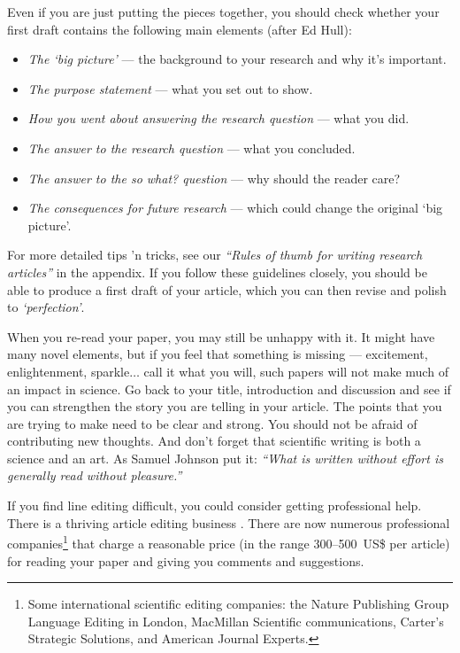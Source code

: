 \documentclass[graybox,envcountchap,sectrefs,UStrade]{svmono}
\begin{document}
Even if you are just putting the pieces together, you should check whether your first draft contains the following main elements (after Ed Hull):

\begin{itemize}
    \item \emph{The `big picture'} --- the background to your research and why it's important.
    \item \emph{The purpose statement} --- what you set out to show.
    \item \emph{How you went about answering the research question} --- what you did.
    \item \emph{The answer to the research question} --- what you concluded.
    \item \emph{The answer to the \emph{so what?} question} --- why should the reader care?
    \item \emph{The consequences for future research} --- which could change the original `big picture'.
\end{itemize}

For more detailed tips 'n tricks, see our \emph{``Rules of thumb for writing research articles''} in the appendix. If you follow these guidelines closely, you should be able to produce a first draft of your article, which you can then revise and polish to \emph{`perfection'}. \par

When you re-read your paper, you may still be unhappy with it. It might have many novel elements, but if you feel that something is missing --- excitement, enlightenment, sparkle$\ldots$  call it what you will, such papers will not make much of an impact in science. Go back to your title, introduction and discussion and see if you can strengthen the story you are telling in your article. The points that you are trying to make need to be clear and strong. You should not be afraid of contributing new thoughts. And don't forget that scientific writing is both a science and an art. As Samuel Johnson put it: \emph{``What is written without effort is generally read without pleasure.''}\par

If you find line editing difficult, you could consider getting professional help. There is a thriving article editing business \citep{Kaplan2010N}. There are now numerous professional companies\footnote{Some international scientific editing companies: the Nature Publishing Group Language Editing in London, MacMillan Scientific communications, Carter's Strategic Solutions, and American Journal Experts.} that charge a reasonable price (in the range 300--500~US\$ per article) for reading your paper and giving you comments and suggestions.\par
\end{document}
